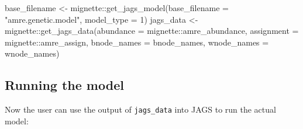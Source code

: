 \documentclass[
]{book}
\newenvironment{Shaded}{\begin{snugshade}}{\end{snugshade}}
\newcommand{\AttributeTok}[1]{\textcolor[rgb]{0.77,0.63,0.00}{#1}}
\newcommand{\ConstantTok}[1]{\textcolor[rgb]{0.00,0.00,0.00}{#1}}
\newcommand{\DecValTok}[1]{\textcolor[rgb]{0.00,0.00,0.81}{#1}}
\newcommand{\FunctionTok}[1]{\textcolor[rgb]{0.00,0.00,0.00}{#1}}
\newcommand{\NormalTok}[1]{#1}
\newcommand{\OtherTok}[1]{\textcolor[rgb]{0.56,0.35,0.01}{#1}}
\newcommand{\SpecialCharTok}[1]{\textcolor[rgb]{0.00,0.00,0.00}{#1}}
\newcommand{\StringTok}[1]{\textcolor[rgb]{0.31,0.60,0.02}{#1}}
\begin{document}
\begin{Shaded}
\begin{Highlighting}[]
\NormalTok{base\_filename }\OtherTok{\textless{}{-}}\NormalTok{ mignette}\SpecialCharTok{::}\FunctionTok{get\_jags\_model}\NormalTok{(}\AttributeTok{base\_filename =} \StringTok{"amre.genetic.model"}\NormalTok{, }\AttributeTok{model\_type =} \DecValTok{1}\NormalTok{)}
\NormalTok{jags\_data }\OtherTok{\textless{}{-}}\NormalTok{ mignette}\SpecialCharTok{::}\FunctionTok{get\_jags\_data}\NormalTok{(}\AttributeTok{abundance =}\NormalTok{ mignette}\SpecialCharTok{::}\NormalTok{amre\_abundance, }
                           \AttributeTok{assignment =}\NormalTok{ mignette}\SpecialCharTok{::}\NormalTok{amre\_assign,}
                           \AttributeTok{bnode\_names =}\NormalTok{ bnode\_names, }
                           \AttributeTok{wnode\_names =}\NormalTok{ wnode\_names)}
\end{Highlighting}
\end{Shaded}

\hypertarget{running-the-model}{%
\subsection{Running the model}\label{running-the-model}}

Now the user can use the output of \texttt{jags\_data} into JAGS to run the actual model:

\begin{Shaded}
\end{Shaded}
\end{document}
